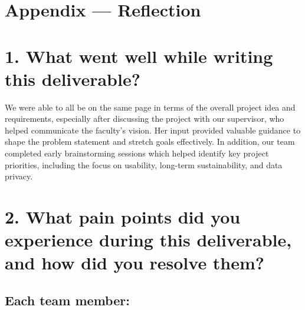 \documentclass{article}
\begin{document}
\newpage{}

\section*{Appendix --- Reflection}




  

\section*{1. What went well while writing this deliverable?}
We were able to all be on the same page in terms of the overall project idea and requirements, especially after discussing the project with our supervisor, who helped communicate the faculty’s vision. Her input provided valuable guidance to shape the problem statement and stretch goals effectively. In addition, our team completed early brainstorming sessions which helped identify key project priorities, including the focus on usability, long-term sustainability, and data privacy.

\section*{2. What pain points did you experience during this deliverable, and how did you resolve them?}

\subsection*{Each team member:}
\end{document}
